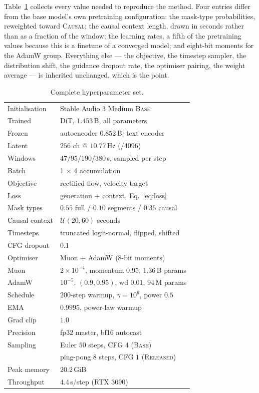 \documentclass[10pt,twocolumn,letterpaper]{article}
\begin{document}
Table~\ref{tab:recipe} collects every value needed to reproduce the method.
Four entries differ from the base model's own pretraining configuration: the
mask-type probabilities, reweighted toward \textsc{Causal}; the causal context
length, drawn in seconds rather than as a fraction of the window; the learning
rates, a fifth of the pretraining values because this is a finetune of a
converged model; and eight-bit moments for the AdamW group. Everything else ---
the objective, the timestep sampler, the distribution shift, the guidance dropout
rate, the optimiser pairing, the weight average --- is inherited unchanged, which
is the point.

\begin{table}[t]
\centering
\small
\begin{tabular}{ll}
\toprule
Initialisation & Stable Audio 3 Medium \textsc{Base} \\
Trained & DiT, $1.453$\,B, all parameters \\
Frozen & autoencoder $0.852$\,B, text encoder \\
Latent & $256$ ch @ $10.77$\,Hz ($/4096$) \\
Windows & $47/95/190/380$\,s, sampled per step \\
Batch & 1 $\times$ 4 accumulation \\
Objective & rectified flow, velocity target \\
Loss & generation $+$ context, Eq.~\eqref{eq:loss} \\
Mask types & $0.55$ full / $0.10$ segments / $0.35$ causal \\
Causal context & $\mathcal{U}(20, 60)$ seconds \\
Timesteps & truncated logit-normal, flipped, shifted \\
CFG dropout & $0.1$ \\
Optimiser & Muon $+$ AdamW (8-bit moments) \\
Muon & $2\!\times\!10^{-4}$, momentum $0.95$, $1.36$\,B params \\
AdamW & $10^{-5}$, $(0.9,0.95)$, wd $0.01$, $94$\,M params \\
Schedule & $200$-step warmup, $\gamma\!=\!10^6$, power $0.5$ \\
EMA & $0.9995$, power-law warmup \\
Grad clip & $1.0$ \\
Precision & fp32 master, bf16 autocast \\
Sampling & Euler $50$ steps, CFG $4$ (\textsc{Base}) \\
 & ping-pong $8$ steps, CFG $1$ (\textsc{Released}) \\
Peak memory & $20.2$\,GiB \\
Throughput & $4.4$\,s/step (RTX 3090) \\
\bottomrule
\end{tabular}
\caption{Complete hyperparameter set.}
\label{tab:recipe}
\end{table}
\end{document}
